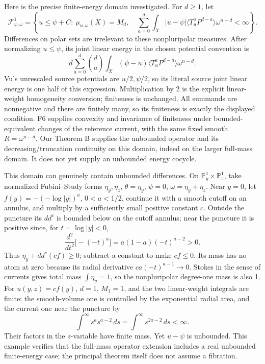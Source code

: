 \documentclass[
  10pt,
]{article}
\begin{document}
Here is the precise finite-energy domain investigated. For \(d\geq1\),
let \[
\mathcal{F}^1_{\psi,\omega}=\left\{u\leq\psi+C:\ \mu_{u,\omega}(X)=M_d,\quad
\sum_{a=0}^d\int_X|u-\psi|\langle T_u^aP^{d-a}\rangle\omega^{n-d}<\infty\right\}.
\] Differences on polar sets are irrelevant to these nonpluripolar
measures. After normalizing \(u\leq\psi\), its joint linear energy in
the chosen potential convention is \[
d\sum_{a=0}^d\binom da\int_X(\psi-u)\langle T_u^aP^{d-a}\rangle\omega^{n-d}.
\] Vu's unrescaled source potentials are \(u/2,\psi/2\), so its literal
source joint linear energy is one half of this expression.
Multiplication by 2 is the explicit linear-weight homogeneity
conversion; finiteness is unchanged. All summands are nonnegative and
there are finitely many, so its finiteness is exactly the displayed
condition. F6 supplies convexity and invariance of finiteness under
bounded-equivalent changes of the reference current, with the same fixed
smooth \(R=\omega^{n-d}\). Our Theorem B supplies the unbounded operator
and its decreasing/truncation continuity on this domain, indeed on the
larger full-mass domain. It does not yet supply an unbounded energy
cocycle.

This domain can genuinely contain unbounded differences. On
\(\mathbb{P}^1_y\times\mathbb{P}^1_z\), take normalized Fubini--Study
forms \(\eta_y,\eta_z\), \(\theta=\eta_y\), \(\psi=0\),
\(\omega=\eta_y+\eta_z\). Near \(y=0\), let \(f(y)=-(-\log|y|)^a\),
\(0<a<1/2\), continue it with a smooth cutoff on an annulus, and
multiply by a sufficiently small positive constant \(c\). Outside the
puncture its \(dd^c\) is bounded below on the cutoff annulus; near the
puncture it is positive since, for \(t=\log|y|<0\), \[
\frac{d^2}{dt^2}\bigl[-(-t)^a\bigr]=a(1-a)(-t)^{a-2}>0.
\] Thus \(\eta_y+dd^c(cf)\geq0\); subtract a constant to make
\(cf\leq0\). Its mass has no atom at zero because its radial derivative
\(ca(-t)^{a-1}\to0\). Stokes in the sense of currents gives total mass
\(\int\eta_y=1\), so the nonpluripolar degree-one mass is also 1. For
\(u(y,z)=cf(y)\), \(d=1\), \(M_1=1\), and the two linear-weight
integrals are finite: the smooth-volume one is controlled by the
exponential radial area, and the current one near the puncture by \[
\int^{\infty}s^a s^{a-2}\,ds=\int^{\infty}s^{2a-2}\,ds<\infty.
\] Their factors in the \(z\)-variable have finite mass. Yet \(u-\psi\)
is unbounded. This example verifies that the full-mass operator
extension includes a real unbounded finite-energy case; the principal
theorem itself does not assume a fibration.
\end{document}
